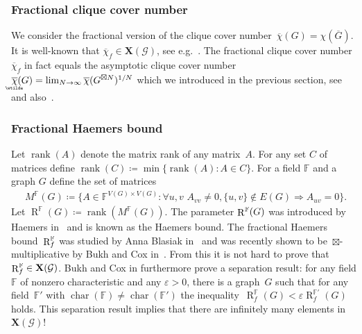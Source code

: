 \documentclass[a4paper, fleqn]{amsart}
\theoremstyle{plain}
\theoremstyle{definition}
\newcommand{\regularize}[1]{\underaccent{\wtilde}{#1}}
\DeclareMathOperator{\rank}{R}
\newcommand{\FF}{\mathbb{F}}
\newcommand{\jeroen}[1]{#1}
\newcommand{\eps}{\varepsilon}
\DeclareMathOperator{\characteristic}{char}
\newcommand{\graphs}{\mathcal{G}}
\newcommand{\aspec}{\mathbf{X}}
\DeclareMathOperator{\matrixrank}{rank}
\begin{document}
\subsubsection{Fractional clique cover number}

%
We consider the fractional version of the clique cover number~$\overline{\chi}(G) = \chi(\overline{G})$. %
It is well-known that
%
%
%
$\overline{\chi}_f \in \aspec(\graphs)$, see e.g.~\cite{schrijver2003combinatorial}.
%
%
%
%
The fractional clique cover number $\overline{\chi}_f$ in fact equals the asymptotic clique cover number~$\regularize{\overline{\chi}}(G) = \lim_{N \to \infty}\overline{\chi}(G^{\boxtimes N})^{1/N}$ which we introduced in the previous section, see~\cite{mceliece1971hide} and also~\cite[Th.~67.17]{schrijver2003combinatorial}.

%
%

%


\subsubsection{Fractional Haemers bound}

%
%
%
%
%
%
%
%
%
%
%
%
%
%
%
%
%
%
Let $\matrixrank(A)$ denote the matrix rank of any matrix~$A$.
For any set $C$ of matrices %
define $\matrixrank(C) \coloneqq \min\{\matrixrank(A): A \in C\}$. 
\jeroen{For a field $\FF$ and a graph $G$ define the set of matrices
%
\begin{align*}
M^\FF(G) \coloneqq \{ A \in \FF^{V(G) \times V(G)} : \forall u,\!v\,\, A_{vv} \neq 0, \{u,v\} \not\in E(G) \Rightarrow A_{uv} = 0\}.
\end{align*}}%
Let
%
$\rank^\FF(G) \coloneqq \matrixrank(M^\FF(G))$. %
%
%
The parameter $\rank^{\smash{\FF}}(G)$ was introduced by Haemers in~\cite{haemers1979some} and is known as the Haemers bound.
The fractional Haemers bound~$\rank^{\smash{\FF}}_{\smash{f}}$ was studied by Anna Blasiak in~\cite{blasiak2013graph} and was recently shown to be~$\boxtimes$-mul\-ti\-pli\-ca\-tive by Bukh and Cox in~\cite{bukh2018fractional}. From this it is not hard to prove that~$\rank^{\smash{\FF}}_{\smash{f}} \in \aspec(\graphs)$. %
%
%
%
%
%
%
%
Bukh and Cox in \cite{bukh2018fractional} furthermore prove a separation result: for any field $\FF$ of nonzero characteristic and any $\eps>0$, there is a graph~$G$ such that for any field~$\FF'$ with $\characteristic(\FF)\neq\characteristic(\FF')$ the inequality~$\rank^\FF_f(G) <\eps \rank^{\FF'}_f(G)$ holds. This separation result implies that there are infinitely many elements in~$\aspec(\graphs)$!
%
\end{document}
